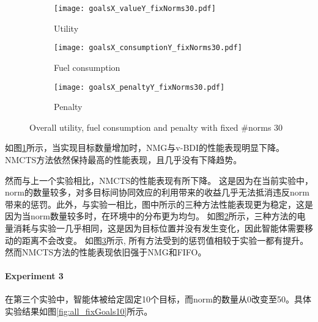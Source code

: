 \begin{figure}
\centering
\begin{subfigure}{.47\textwidth}
  \centering
  \texttt{[image: goalsX\_valueY\_fixNorms30.pdf]}
  \captionsetup{justification=centering}
  \caption{Utility}
  \label{fig:goalsX_valueY_fixNorms30}
\end{subfigure}

\begin{subfigure}{.47\textwidth}
  \centering
  \texttt{[image: goalsX\_consumptionY\_fixNorms30.pdf]}
  \captionsetup{justification=centering}
  \caption{Fuel consumption}
  \label{fig:goalsX_consumptionY_fixNorms30}
\end{subfigure}
\begin{subfigure}{.47\textwidth}
  \centering
  \texttt{[image: goalsX\_penaltyY\_fixNorms30.pdf]}
  \captionsetup{justification=centering}
  \caption{Penalty}
  \label{fig:goalsX_penaltyY_fixNorms30}
\end{subfigure}
\captionsetup{justification=centering}
\caption{Overall utility, fuel consumption and penalty with fixed \#norms 30}
\label{fig:all_fixNorms30}
\end{figure}

如图\ref{fig:goalsX_valueY_fixNorms30}所示，当实现目标数量增加时，NMG与v-BDI的性能表现明显下降。NMCTS方法依然保持最高的性能表现，且几乎没有下降趋势。

然而与上一个实验相比，NMCTS的性能表现有所下降。
这是因为在当前实验中，norm的数量较多，对多目标间协同效应的利用带来的收益几乎无法抵消违反norm带来的惩罚。此外，与实验一相比，图中所示的三种方法性能表现更为稳定，这是因为当norm数量较多时，在环境中的分布更为均匀。
如图\ref{fig:goalsX_consumptionY_fixNorms30}所示，三种方法的电量消耗与实验一几乎相同，这是因为目标位置并没有发生变化，因此智能体需要移动的距离不会改变。
如图\ref{fig:goalsX_penaltyY_fixNorms30}所示, 所有方法受到的惩罚值相较于实验一都有提升。然而NMCTS方法的性能表现依旧强于NMG和FIFO。

\paragraph{Experiment 3}
在第三个实验中，智能体被给定固定10个目标，而norm的数量从0改变至50。具体实验结果如图\ref{fig:all_fixGoals10}所示。

